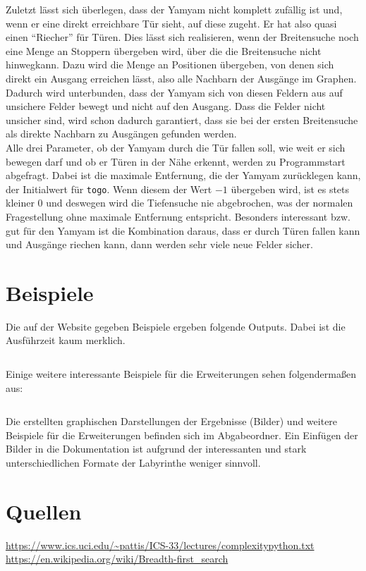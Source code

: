 \documentclass[12pt]{article}
\begin{document}
Zuletzt lässt sich überlegen, dass der Yamyam nicht komplett zufällig ist und, wenn er eine direkt erreichbare Tür sieht, auf diese zugeht. Er hat also quasi einen ``Riecher'' für Türen. Dies lässt sich realisieren, wenn der Breitensuche noch eine Menge an Stoppern übergeben wird, über die die Breitensuche nicht hinwegkann. Dazu wird die Menge an Positionen übergeben, von denen sich direkt ein Ausgang erreichen lässt, also alle Nachbarn der Ausgänge im Graphen. Dadurch wird unterbunden, dass der Yamyam sich von diesen Feldern aus auf unsichere Felder bewegt und nicht auf den Ausgang. Dass die Felder nicht unsicher sind, wird schon dadurch garantiert, dass sie bei der ersten Breitensuche als direkte Nachbarn zu Ausgängen gefunden werden.\\

Alle drei Parameter, ob der Yamyam durch die Tür fallen soll, wie weit er sich bewegen darf und ob er Türen in der Nähe erkennt, werden zu Programmstart abgefragt. Dabei ist die maximale Entfernung, die der Yamyam zurücklegen kann, der Initialwert für \texttt{togo}. Wenn diesem der Wert $-1$ übergeben wird, ist es stets kleiner 0 und deswegen wird die Tiefensuche nie abgebrochen, was der normalen Fragestellung ohne maximale Entfernung entspricht. Besonders interessant bzw. gut für den Yamyam ist die Kombination daraus, dass er durch Türen fallen kann und Ausgänge riechen kann, dann werden sehr viele neue Felder sicher.


\section{Beispiele}
 Die auf der Website gegeben Beispiele ergeben folgende Outputs. Dabei ist die Ausführzeit kaum merklich.
 \inputminted[breaklines]{bash}{/home/nicholas/informatik/bwinf/Runde2/Aufgabe3/Abgabe/Aufgabe3/Beispiele/output}
 Einige weitere interessante Beispiele für die Erweiterungen sehen folgendermaßen aus:
 \inputminted[breaklines]{bash}{/home/nicholas/informatik/bwinf/Runde2/Aufgabe3/Abgabe/Aufgabe3/Beispiele/interessant}
Die erstellten graphischen Darstellungen der Ergebnisse (Bilder) und weitere Beispiele für die Erweiterungen befinden sich im Abgabeordner. Ein Einfügen der Bilder in die Dokumentation ist aufgrund der interessanten und stark unterschiedlichen Formate der Labyrinthe weniger sinnvoll.

\section{Quellen}
\begin{thebibliography}{9}

\url{https://www.ics.uci.edu/~pattis/ICS-33/lectures/complexitypython.txt}
\url{https://en.wikipedia.org/wiki/Breadth-first_search}

\end{thebibliography}
\end{document}
